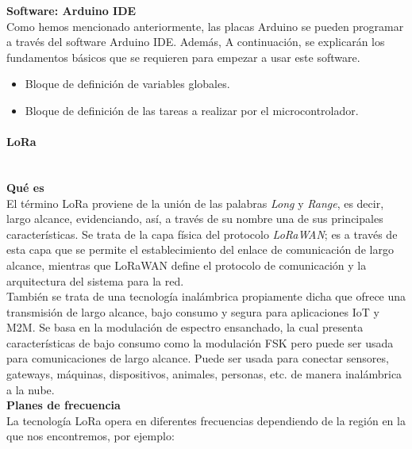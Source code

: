 \documentclass[12pt]{article}
\newcommand{\subsubsubsection}[1]{\paragraph{#1}\mbox{}\\}
\begin{document}
	
	\noindent \textbf{Software: Arduino IDE} \\
	
	
	\noindent Como hemos mencionado anteriormente, las placas Arduino se pueden programar a través del software Arduino IDE. Además, A continuación, se explicarán los fundamentos básicos que se requieren para empezar a usar este software. \\
	
	\begin{itemize}
		\item Bloque de definición de variables globales.
		\item Bloque de definición de las tareas a realizar por el microcontrolador.
	\end{itemize}
	
	\subsubsubsection{LoRa}
	
	\noindent \textbf{Qué es}\\
	
	\noindent El término LoRa proviene de la unión de las palabras \textit{Long} y \textit{Range}, es decir, largo alcance, evidenciando, así, a través de su nombre una de sus principales características. Se trata de la capa física del protocolo \textit{LoRaWAN}; es a través de esta capa que se permite el establecimiento del enlace de comunicación de largo alcance, mientras que LoRaWAN define el protocolo de comunicación y la arquitectura del sistema para la red. \\
	
	\noindent También se trata de una tecnología inalámbrica propiamente dicha que ofrece una transmisión de largo alcance, bajo consumo y segura para aplicaciones IoT y M2M. Se basa en la modulación de espectro ensanchado, la cual presenta características de bajo consumo como la modulación FSK pero puede ser usada para comunicaciones de largo alcance. Puede ser usada para conectar sensores, gateways, máquinas, dispositivos, animales, personas, etc. de manera inalámbrica a la nube.\\
	
	\noindent \textbf{Planes de frecuencia} \\
	
	\noindent La tecnología LoRa opera en diferentes frecuencias dependiendo de la región en la que nos encontremos, por ejemplo: \\
	
\end{document}

